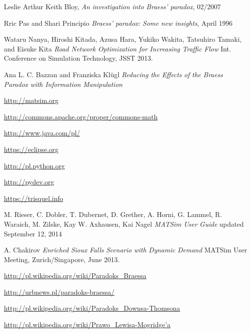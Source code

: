 \documentclass[twoside,12pt]{report}
\begin{document}
\begin{thebibliography}{99}
	Leslie Arthur Keith Bloy, 
	\newblock \textit{An investigation into Braess’ paradox}, 02/2007

	Rric Pas and Shari Principio
	\newblock \textit{Braess’ paradox: Some new insights}, April 1996

	Wataru Nanya, Hiroshi Kitada, Azusa Hara, Yukiko Wakita, Tatsuhiro Tamaki, and Eisuke Kita
	\newblock \textit{Road Network Optimization for Increasing Traffic Flow}
	\newblock Int. Conference on Simulation Technology, JSST 2013.

	Ana L. C. Bazzan and Franziska Klügl
	\newblock \textit{Reducing the Effects of the Braess Paradox with Information Manipulation}

	\url{http://matsim.org}	

	\url{http://commons.apache.org/proper/commons-math}

	\url{http://www.java.com/pl/}

	\url{https://eclipse.org}
				
	\url{http://pl.python.org}
	
	\url{http://pydev.org}
	
	\url{https://trisquel.info}
			
	M. Rieser, C. Dobler, T. Dubernet, D. Grether, A. Horni, G. Lammel, R. Waraich, M. Zilske, Kay W. Axhausen, Kai Nagel
	\newblock \textit{MATSim User Guide}
	\newblock updated September 12, 2014

	A. Chakirov
	\newblock \textit{Enriched Sioux Falls Scenario with Dynamic Demand}
	\newblock MATSim User Meeting, Zurich/Singapore, June 2013.
	
	\url{http://pl.wikipedia.org/wiki/Paradoks_Braessa}
	
	\url{http://urbnews.pl/paradoks-braessa/}
	
	\url{http://pl.wikipedia.org/wiki/Paradoks_Downsa-Thomsona}
	
	\url{http://pl.wikipedia.org/wiki/Prawo_Lewisa-Mogridge’a}

\end{thebibliography}


\end{document}
